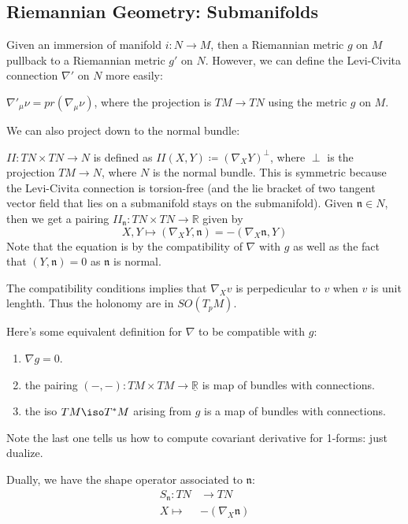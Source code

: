 \documentclass[main.tex]{subfiles}
\begin{document}
\subsection{Riemannian Geometry: Submanifolds}

Given an immersion of manifold $i: N \rightarrow M$, then a Riemannian metric $g$ on $M$ pullback to a Riemannian metric $g'$ on $N$. However, we can define the Levi-Civita connection
$\nabla'$ on $N$ more easily:
\begin{lemma}
$\nabla'_{\mu} \nu = pr (\nabla_{\mu} \nu)$, where the projection is $TM \rightarrow TN$ using the metric $g$ on $M$. 
\end{lemma}

We can also project down to the normal bundle:
\begin{definition}
$II: TN \times TN \rightarrow N$ is defined as $II(X, Y) \coloneqq (\nabla_{X} Y)^\perp$, where $\perp$ is the projection $TM \rightarrow N$, where $N$ is the normal bundle. This is symmetric because the Levi-Civita connection is torsion-free (and the lie bracket of two tangent vector field that lies on a submanifold stays on the submanifold).
Given $\mathfrak{n} \in N$, then we get a pairing $II_\mathfrak{n}: TN \times TN \rightarrow \mathbb{R}$ given by 
$$
X, Y \mapsto (\nabla_{X} Y, \mathfrak{n}) = - (\nabla_{X} \mathfrak{n}, Y)
$$
Note that the equation is by the compatibility of $\nabla$ with $g$ as well as the fact that $(Y, \mathfrak{n}) = 0$ as $\mathfrak{n}$ is normal.

The compatibility conditions implies that 
$\nabla_X v$ is perpedicular to $v$ when $v$ is unit lenghth. Thus the holonomy are in $SO(T_pM)$. 

Here's some equivalent definition for $\nabla$ to be compatible with $g$:
\begin{enumerate}
    \item $\nabla g = 0$.
    \item the pairing $(-,-): TM \times TM \rightarrow \underline{\mathbb{R}}$ is map of bundles with connections.
    \item the iso $TM \iso T^*M$ arising from $g$ is a map of bundles with connections.
\end{enumerate}

Note the last one tells us how to compute covariant derivative for 1-forms: just dualize.

Dually, we have the shape operator associated to $\mathfrak{n}$: 
\begin{align*}
S_{\mathfrak{n}}: TN &\rightarrow TN \\ 
X  \mapsto & - (\nabla_{X} \mathfrak{n}) 
\end{align*}
\end{definition}
\end{document}
